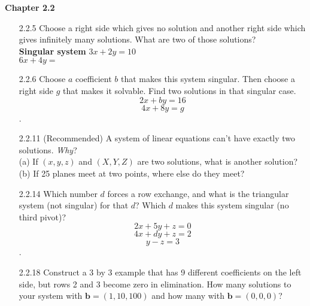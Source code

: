\documentclass[10pt,twoside,reqno]{article}
\begin{document}
\textbf{Chapter 2.2}
\begin{enumerate}
\item[2.2.5]Choose a right side which gives no solution and another right side which gives infinitely many solutions. What are two of those solutions? \\
\vspace{3mm}
\hspace{100pt}
\textbf{Singular system}
\hspace{45pt}
$3x + 2y = 10$\\
\hspace{232pt}
$6x + 4y =$\\
\vspace{3mm}
\item[2.2.6]Choose $a$ coefficient $b$ that makes this system singular. Then choose a right side $g$ that makes it solvable. Find two solutions in that singular case. \\
$$2x + by = 16$$ $$4x + 8y = g$$.
\item[2.2.11](Recommended) A system of linear equations can't have exactly two solutions. \textit{Why}? \\
\vspace{3mm}
\hspace{10pt}(a) If $(x, y, z)$ and $(X, Y, Z)$ are two solutions, what is another solution?\\
\vspace{3mm}
\hspace{10pt}(b) If 25 planes meet at two points, where else do they meet? 
\vspace{3mm}
\item[2.2.14]Which number $d$ forces a row exchange, and what is the triangular system (not singular) for that $d$? Which $d$ makes this system singular (no third pivot)?
$$2x + 5y + z = 0$$ $$4x + dy + z = 2$$ $$y -z = 3$$. 
\item[2.2.18]Construct a 3 by 3 example that has 9 different coefficients on the left side, but rows 2 and 3 become zero in elimination. How many solutions to your system with $\pmb{b} = (1,10,100)$ and how many with $\pmb{b} = (0,0,0)$? 
\vspace{3mm}

\end{enumerate}
\end{document}
